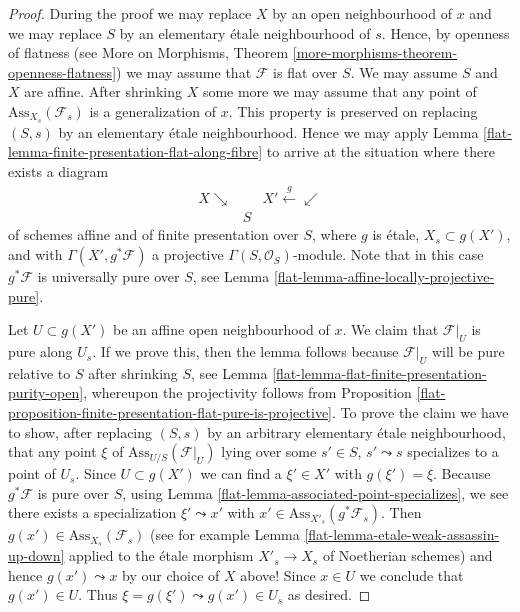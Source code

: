 \begin{proof}

During the proof we may replace $X$ by an open neighbourhood of $x$
and we may replace $S$ by an elementary \'etale neighbourhood of $s$.
Hence, by openness of flatness (see
More on Morphisms, Theorem \ref{more-morphisms-theorem-openness-flatness})
we may assume that $\mathcal{F}$ is flat over $S$.
We may assume $S$ and $X$ are affine.
After shrinking $X$ some more we may assume that any
point of $\text{Ass}_{X_s}(\mathcal{F}_s)$ is a generalization of $x$.
This property is preserved on replacing $(S, s)$ by an elementary
\'etale neighbourhood. Hence we may apply
Lemma \ref{flat-lemma-finite-presentation-flat-along-fibre}
to arrive at the situation where there exists a diagram
$$
\begin{array}{ccc}X \searrow &  & X' \overset{g}{\longleftarrow}\swarrow \\  & S & \end{array}
$$
of schemes affine and of finite presentation over $S$,
where $g$ is \'etale, $X_s \subset g(X')$, and with
$\Gamma(X', g^*\mathcal{F})$ a projective $\Gamma(S, \mathcal{O}_S)$-module.
Note that in this case $g^*\mathcal{F}$ is universally pure over $S$, see
Lemma \ref{flat-lemma-affine-locally-projective-pure}.

\medskip\noindent
Let $U \subset g(X')$ be an affine open neighbourhood of $x$.
We claim that $\mathcal{F}|_U$ is pure along $U_s$. If we prove this, then
the lemma follows because $\mathcal{F}|_U$ will be pure relative to $S$
after shrinking $S$, see
Lemma \ref{flat-lemma-flat-finite-presentation-purity-open},
whereupon the projectivity follows from
Proposition \ref{flat-proposition-finite-presentation-flat-pure-is-projective}.
To prove the claim we have to show, after replacing $(S, s)$
by an arbitrary elementary \'etale neighbourhood, that any point $\xi$ of
$\text{Ass}_{U/S}(\mathcal{F}|_U)$ lying over some
$s' \in S$, $s' \leadsto s$ specializes to a point of $U_s$.
Since $U \subset g(X')$ we can find a $\xi' \in X'$ with
$g(\xi') = \xi$. Because $g^*\mathcal{F}$ is pure over $S$, using
Lemma \ref{flat-lemma-associated-point-specializes},
we see there exists a specialization $\xi' \leadsto x'$ with
$x' \in \text{Ass}_{X'_s}(g^*\mathcal{F}_s)$. Then
$g(x') \in \text{Ass}_{X_s}(\mathcal{F}_s)$ (see for example
Lemma \ref{flat-lemma-etale-weak-assassin-up-down}
applied to the \'etale morphism $X'_s \to X_s$ of Noetherian schemes)
and hence $g(x') \leadsto x$ by our choice of $X$ above! Since
$x \in U$ we conclude that $g(x') \in U$. Thus
$\xi = g(\xi') \leadsto g(x') \in U_s$ as desired.
\end{proof}

